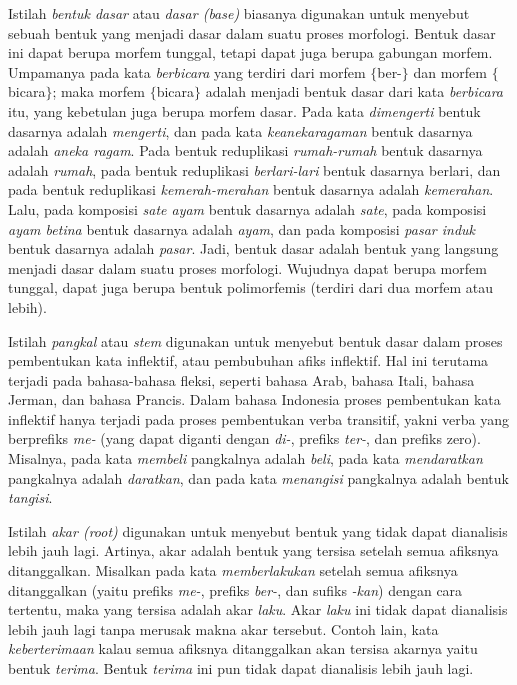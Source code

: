Istilah \textit{bentuk dasar} atau \textit{dasar (base)} biasanya digunakan untuk menyebut sebuah bentuk yang menjadi dasar dalam suatu proses morfologi. Bentuk dasar ini dapat berupa morfem tunggal, tetapi dapat juga berupa gabungan morfem. Umpamanya pada kata \textit{berbicara} yang terdiri dari morfem $\lbrace$ber-$\rbrace$ dan morfem $\lbrace$bicara$\rbrace$; maka morfem $\lbrace$bicara$\rbrace$ adalah menjadi bentuk dasar dari kata \textit{berbicara} itu, yang kebetulan juga berupa morfem dasar. Pada kata \textit{dimengerti} bentuk dasarnya adalah \textit{mengerti}, dan pada kata \textit{keanekaragaman} bentuk dasarnya adalah \textit{aneka ragam}. Pada bentuk reduplikasi \textit{rumah-rumah} bentuk dasarnya adalah \textit{rumah}, pada bentuk reduplikasi \textit{berlari-lari} bentuk dasarnya berlari, dan pada bentuk reduplikasi \textit{kemerah-merahan} bentuk dasarnya adalah \textit{kemerahan}. Lalu, pada komposisi \textit{sate ayam} bentuk dasarnya adalah \textit{sate}, pada komposisi \textit{ayam betina} bentuk dasarnya adalah \textit{ayam}, dan pada komposisi \textit{pasar induk} bentuk dasarnya adalah \textit{pasar}. Jadi, bentuk dasar adalah bentuk yang langsung menjadi dasar dalam suatu proses morfologi. Wujudnya dapat berupa morfem tunggal, dapat juga berupa bentuk polimorfemis (terdiri dari dua morfem atau lebih).

Istilah \textit{pangkal} atau \textit{stem} digunakan untuk menyebut bentuk dasar dalam proses pembentukan kata inflektif, atau pembubuhan afiks inflektif. Hal ini terutama terjadi pada bahasa-bahasa fleksi, seperti bahasa Arab, bahasa Itali, bahasa Jerman, dan bahasa Prancis. Dalam bahasa Indonesia proses pembentukan kata inflektif hanya terjadi pada proses pembentukan verba transitif, yakni verba yang berprefiks \textit{me-} (yang dapat diganti dengan \textit{di-}, prefiks \textit{ter-}, dan prefiks zero). Misalnya, pada kata \textit{membeli} pangkalnya adalah \textit{beli}, pada kata \textit{mendaratkan} pangkalnya adalah \textit{daratkan}, dan pada kata \textit{menangisi} pangkalnya adalah bentuk \textit{tangisi}.

Istilah \textit{akar (root)} digunakan untuk menyebut bentuk yang tidak dapat dianalisis lebih jauh lagi. Artinya, akar adalah bentuk yang tersisa setelah semua afiksnya ditanggalkan. Misalkan pada kata \textit{memberlakukan} setelah semua afiksnya ditanggalkan (yaitu prefiks \textit{me-}, prefiks \textit{ber-}, dan sufiks \textit{-kan}) dengan cara tertentu, maka yang tersisa adalah akar \textit{laku}. Akar \textit{laku} ini tidak dapat dianalisis lebih jauh lagi tanpa merusak makna akar tersebut. Contoh lain, kata \textit{keberterimaan} kalau semua afiksnya ditanggalkan akan tersisa akarnya yaitu bentuk \textit{terima}. Bentuk \textit{terima} ini pun tidak dapat dianalisis lebih jauh lagi.

